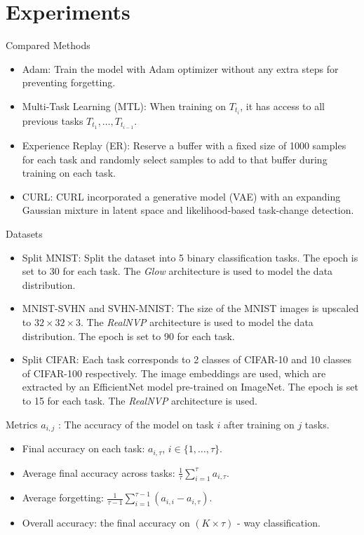 \documentclass{beamer}
\begin{document}
\section{Experiments}
\begin{frame}{Compared Methods}
  \begin{itemize}
    \item <1-> Adam: Train the model with Adam optimizer without any extra steps for preventing forgetting.
    \item <1-> Multi-Task Learning (MTL): When training on $T_{t_i}$, it has access to all previous tasks $T_{t_1}, \dots, T_{t_{i-1}}$.
    \item <1-> Experience Replay (ER): Reserve a buffer with a fixed size of 1000 samples for each task and randomly select samples to add to that buffer during training on each task.
    \item <1-> CURL: CURL incorporated a generative model (VAE) with an expanding Gaussian mixture in latent space and likelihood-based task-change detection.
  \end{itemize}
\end{frame}

\begin{frame}{Datasets}
  \begin{itemize}
    \item <1-> Split MNIST: Split the dataset into 5 binary classification tasks. The epoch is set to 30 for each task. The \emph{Glow} architecture is used to model the data distribution.
    \item <1-> MNIST-SVHN and SVHN-MNIST: The size of the MNIST images is upscaled to $32 \times 32 \times 3$. The \emph{RealNVP} architecture is used to model the data distribution. The epoch is set to 90 for each task.
    \item <1-> Split CIFAR: Each task corresponds to 2 classes of CIFAR-10 and 10 classes of CIFAR-100 respectively. The image embeddings are used, which are extracted by an EfficientNet model pre-trained on ImageNet. The epoch is set to 15 for each task. The \emph{RealNVP} architecture is used.
  \end{itemize}
\end{frame}

\begin{frame}{Metrics}
  $a_{i, j}$ : The accuracy of the model on task $i$ after training on $j$ tasks.

  \begin{itemize}
    \item <1-> Final accuracy on each task: $a_{i, \tau}$, $i \in \{ 1, \dots, \tau \}$.
    \item <1-> Average final accuracy across tasks: $\frac{1}{\tau} \sum_{i = 1}^\tau a_{i, \tau}$.
    \item <1-> Average forgetting: $\frac{1}{\tau - 1} \sum_{i = 1}^{\tau - 1} (a_{i, i} - a_{i, \tau})$.
    \item <1-> Overall accuracy: the final accuracy on $(K \times \tau)$ - way classification.
  \end{itemize}
\end{frame}
\end{document}
